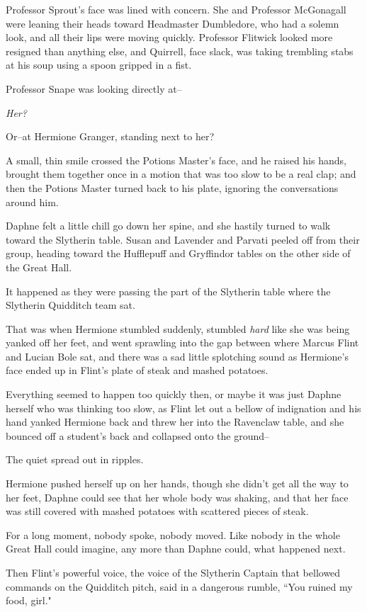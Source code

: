 Professor Sprout's face was lined with concern. She and Professor McGonagall were leaning their heads toward Headmaster Dumbledore, who had a solemn look, and all their lips were moving quickly. Professor Flitwick looked more resigned than anything else, and Quirrell, face slack, was taking trembling stabs at his soup using a spoon gripped in a fist.

Professor Snape was looking directly at\---

\emph{Her?}

Or\---at Hermione Granger, standing next to her?

A small, thin smile crossed the Potions Master's face, and he raised his hands, brought them together once in a motion that was too slow to be a real clap; and then the Potions Master turned back to his plate, ignoring the conversations around him.

Daphne felt a little chill go down her spine, and she hastily turned to walk toward the Slytherin table. Susan and Lavender and Parvati peeled off from their group, heading toward the Hufflepuff and Gryffindor tables on the other side of the Great Hall.

It happened as they were passing the part of the Slytherin table where the Slytherin Quidditch team sat.

That was when Hermione stumbled suddenly, stumbled \emph{hard} like she was being yanked off her feet, and went sprawling into the gap between where Marcus Flint and Lucian Bole sat, and there was a sad little splotching sound as Hermione's face ended up in Flint's plate of steak and mashed potatoes.

Everything seemed to happen too quickly then, or maybe it was just Daphne herself who was thinking too slow, as Flint let out a bellow of indignation and his hand yanked Hermione back and threw her into the Ravenclaw table, and she bounced off a student's back and collapsed onto the ground\---

The quiet spread out in ripples.

Hermione pushed herself up on her hands, though she didn't get all the way to her feet, Daphne could see that her whole body was shaking, and that her face was still covered with mashed potatoes with scattered pieces of steak.

For a long moment, nobody spoke, nobody moved. Like nobody in the whole Great Hall could imagine, any more than Daphne could, what happened next.

Then Flint's powerful voice, the voice of the Slytherin Captain that bellowed commands on the Quidditch pitch, said in a dangerous rumble, ``You ruined my food, girl."

